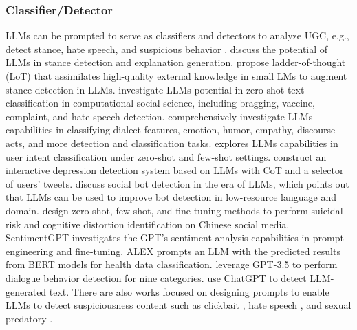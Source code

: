 \documentclass[11pt]{article}
\begin{document}
\subsubsection{Classifier/Detector}
LLMs can be prompted to serve as classifiers and detectors to analyze UGC, e.g., detect stance, hate speech, and suspicious behavior \cite{robinson2022leveraging, sun2023text}. 
\citet{zhang2022would} discuss the potential of LLMs in stance detection and explanation generation. \citet{hu2023ladder} propose ladder-of-thought (LoT) that assimilates high-quality external knowledge in small LMs to augment stance detection in LLMs.
\citet{mu2023navigating} investigate LLMs potential in zero-shot text classification in computational social science, including bragging, vaccine, complaint, and hate speech detection. \citet{ziems2023can} comprehensively investigate LLMs capabilities in classifying dialect features, emotion, humor, empathy, discourse acts, and more detection and classification tasks. \citet{parikh2023exploring} explores LLMs capabilities in user intent classification under zero-shot and few-shot settings. 
\citet{qin2023read} construct an interactive depression detection system based on LLMs with CoT and a selector of users' tweets. \citet{ferrara2023social} discuss social bot detection in the era of LLMs, which points out that LLMs can be used to improve bot detection in low-resource language and domain. \citet{qi2023evaluating} design zero-shot, few-shot, and fine-tuning methods to perform suicidal risk and cognitive distortion identification on Chinese social media. SentimentGPT \cite{kheiri2023sentimentgpt} investigates the GPT's sentiment analysis capabilities in prompt engineering and fine-tuning. ALEX \cite{jiang2023balanced} prompts an LLM with the predicted results from BERT models for health data classification. \citet{finch2023leveraging} leverage GPT-3.5 to perform dialogue behavior detection for nine categories. \citet{bhattacharjee2023fighting} use ChatGPT to detect LLM-generated text. There are also works focused on designing prompts to enable LLMs to detect suspiciousness content such as clickbait \cite{zhu2023clickbait}, hate speech \cite{chiu2021detecting}, and sexual predatory \cite{nguyen2023fine}. 
\end{document}
